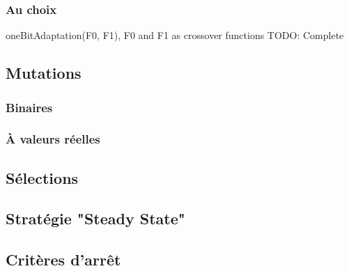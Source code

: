 \documentclass[12pt, letterpaper]{article}
\begin{document}
\subsubsection{Au choix}
oneBitAdaptation(F0, F1), F0 and F1 as crossover functions
TODO: Complete

\subsection{Mutations}
\subsubsection{Binaires}

\subsubsection{À valeurs réelles}

\subsection{Sélections}

\subsection{Stratégie "Steady State" }

\subsection{Critères d'arrêt}
\end{document}
